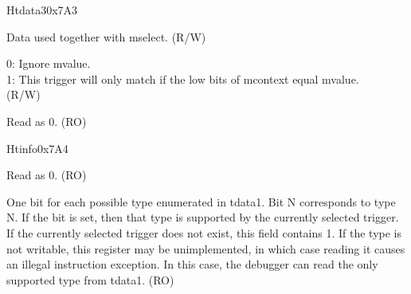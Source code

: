 \begin{register}{H}{tdata3}{0x7A3}\label{regdesc:TDATA3}
%
%
%
\regnewline%
\begin{regdesc}\begin{reglist}
\label{fielddesc:MVALUE}\item [mvalue] Data used together with mselect. (R/W)
\label{fielddesc:MSELECT}\item [mselect]
0: Ignore mvalue. \\
1: This trigger will only match if the low bits of mcontext equal mvalue. \\
(R/W)
\label{fielddesc:tdata3_rsvd}\item [Reserved] Read as 0. (RO)
\end{reglist}\end{regdesc}
\end{register}

\begin{register}{H}{tinfo}{0x7A4}\label{regdesc:TINFO}
%
%
\regnewline%
\begin{regdesc}\begin{reglist}
\label{fielddesc:tinfo_rsvd}\item [Reserved] Read as 0. (RO)
\label{fielddesc:INFO}\item [info] One bit for each possible type enumerated in tdata1. Bit N corresponds to type N. If the bit is set, then that type is supported by the currently selected trigger. If the currently selected trigger does not exist, this field contains 1. If the type is not writable, this register may be unimplemented, in which case reading it causes an illegal instruction exception. In this case, the debugger can read the only supported type from tdata1. (RO)
\end{reglist}\end{regdesc}
\end{register}

